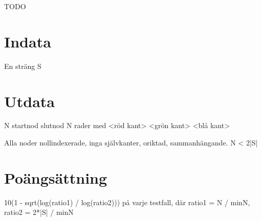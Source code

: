\def\version{1}
TODO

\section*{Indata}
En sträng S

\section*{Utdata}
N startnod slutnod
N rader med <röd kant> <grön kant> <blå kant>

Alla noder nollindexerade, inga självkanter, oriktad, sammanhängande.
N < 2|S|

\section*{Poängsättning}
10(1 - sqrt(log(ratio1) / log(ratio2))) på varje testfall, där ratio1 = N / minN, ratio2 = 2*|S| / minN
